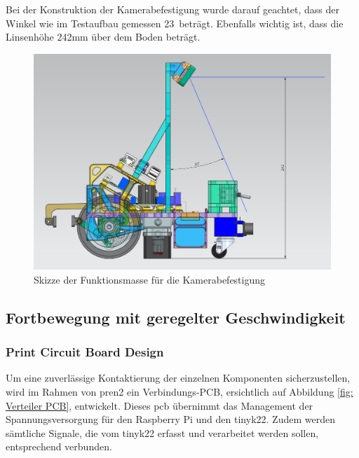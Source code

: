 Bei der Konstruktion der Kamerabefestigung wurde darauf geachtet, dass der Winkel wie im Testaufbau gemessen 23\textdegree\ beträgt. Ebenfalls wichtig ist, dass die Linsenhöhe 242mm über dem Boden beträgt. 

 \begin{figure}[H]
\centering
\includegraphics[width= \textwidth ]{assets/MT/Sichtfeld_Roboter.png}
\caption{Skizze der Funktionsmasse für die Kamerabefestigung}
\label{fig:Skizze der Funktionsmasse für die Kamerabefestigung}
\end{figure}

\subsection{Fortbewegung mit geregelter Geschwindigkeit}

\subsubsection{Print Circuit Board Design}
\label{pcb}

Um eine zuverlässige Kontaktierung der einzelnen Komponenten sicherzustellen, wird im Rahmen von \acrshort{pren2} ein Verbindungs-PCB, ersichtlich auf Abbildung \ref{fig: Verteiler PCB}, entwickelt. Dieses \acrshort{pcb} übernimmt das Management der
Spannungsversorgung für den Raspberry Pi und den \gls{tinyk22}. Zudem werden sämtliche Signale,
die vom \gls{tinyk22} erfasst und verarbeitet werden sollen, entsprechend verbunden.

